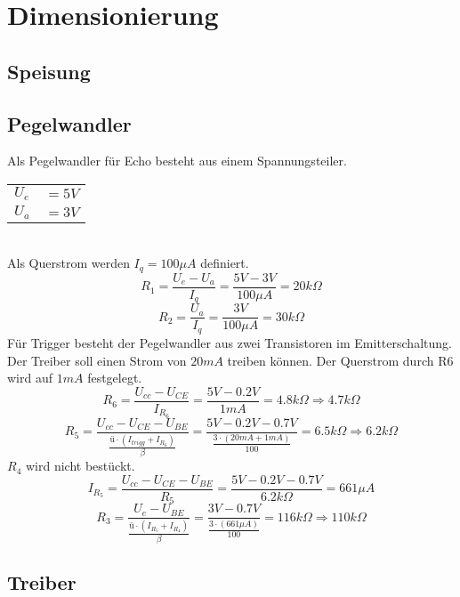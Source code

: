 



\section{Dimensionierung}

\subsection{Speisung}

\subsection{Pegelwandler}
Als Pegelwandler für Echo besteht aus einem Spannungsteiler. \\
\begin{tabular}{@{}ll}
  $U_e$ & $= 5 V$ \\
  $U_a$ & $= 3 V$ \\
\end{tabular} \\
Als Querstrom werden $I_q = 100 \mu A$ definiert. 
\[ R_1 = \frac{U_e - U_a}{I_q} = \frac{5 V - 3 V}{100 \mu A} = 20 k\Omega \]
\[ R_2 = \frac{U_a}{I_q} = \frac{3 V}{100 \mu A} = 30 k\Omega \]
Für Trigger besteht der Pegelwandler aus zwei Transistoren im 
Emitterschaltung. 
Der Treiber soll einen Strom von $20 mA$ treiben können. Der Querstrom 
durch R6 wird auf $1 mA$ festgelegt. 
\[ R_6 = \frac{U_{cc} - U_{CE}}{I_{R_6}} = \frac{5 V - 0.2 V}{1 mA} 
= 4.8 k\Omega \Rightarrow 4.7 k\Omega \]
\[ R_5 = \frac{U_{cc} - U_{CE} - U_{BE}}
{\frac{ü \cdot (I_{trigg} + I_ {R_6})}{\beta}}
= \frac{5 V - 0.2 V - 0.7 V}{\frac{3 \cdot (20 mA + 1 mA)}{100}} 
= 6.5 k\Omega \Rightarrow 6.2 k\Omega \]
$R_4$ wird nicht bestückt. 
\[ I_{R_5} = \frac{U_{cc} - U_{CE} - U_{BE}}{R_5} 
= \frac{5 V - 0.2 V - 0.7 V}{6.2 k\Omega} = 661 \mu A \]
\[ R_3 = \frac{U_e - U_{BE}}{\frac{ü \cdot (I_{R_5} + I_{R_4})}{\beta}} 
= \frac{3 V - 0.7 V}{\frac{3 \cdot (661 \mu A)}{100}} = 116 k\Omega 
\Rightarrow 110 k\Omega \]
\subsection{Treiber}
